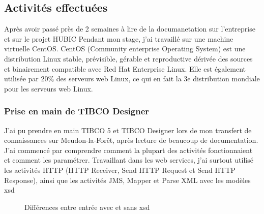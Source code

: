 \subsection{Activités effectuées}
Après avoir passé près de 2 semaines à lire de la documanetation sur l'entreprise et sur
le projet HUBIC Pendant mon stage, j'ai travaillé sur une machine virtuelle CentOS. CentOS
(Community enterprise Operating System) est une distribution Linux stable, prévisible, gérable
et reproductive dérivée des sources et binairement compatible avec Red Hat Enterprise Linux.
Elle est également utilisée par 20\% des serveurs web Linux, ce qui en fait la 3e distribution
mondiale pour les serveurs web Linux.
\subsubsection{Prise en main de TIBCO Designer}
J'ai pu prendre en main TIBCO 5 et TIBCO Designer lors de mon transfert de connaissances
sur Meudon-la-Forêt, après lecture de beaucoup de documentation. J'ai commencé par
comprendre comment la plupart des activités fonctionnaient et comment les paramétrer. Travaillant
dans les web services, j'ai surtout utilisé les activités HTTP (HTTP Receiver, Send
HTTP Request et Send HTTP Response), ainsi que les activités JMS, Mapper et Parse XML
avec les modèles \gls{xsd}
\begin{figure}[!h]
	\centering \caption{Différences entre entrée avec et sans \gls{xsd}}
	\centering
	\label{Diff}
\end{figure}

